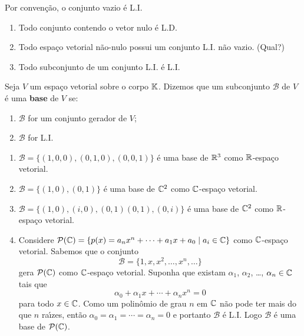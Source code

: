 \begin{observacao}\label{conjutoLDLI}
	Por conven\c{c}\~ao, o conjunto vazio \'e L.I.
\end{observacao}

\begin{propriedades}
	\begin{enumerate}[label={\roman*})]
		\item Todo conjunto contendo o vetor nulo \'e L.D.
		\item Todo espa\c{c}o vetorial n\~ao-nulo possui um conjunto L.I. n\~ao vazio. (Qual?)
		\item Todo subconjunto de um conjunto L.I. \'e L.I.
	\end{enumerate}
\end{propriedades}

\begin{definicao}
	Seja $V$ um espa\c{c}o vetorial sobre o corpo $\mathbb{K}$. Dizemos que um subconjunto $\mathcal{B}$ de $V$ \'e uma \textbf{base} de $V$ se:
	\begin{enumerate}[label={\roman*})]
		\item $\mathcal{B}$ for um conjunto gerador de $V$;
		\item $\mathcal{B}$ for L.I.
	\end{enumerate}
\end{definicao}

\begin{exemplo}
	\begin{enumerate}[label={\arabic*})]
		\item $\mathcal{B} = \{(1, 0 , 0), (0, 1, 0), (0, 0 ,1)\}$ \'e uma base de $\mathbb{R}^3$ como $\mathbb{R}$-espa\c{c}o vetorial.
		\item $\mathcal{B} = \{(1, 0), (0, 1)\}$ \'e uma base de $\mathbb{C}^2$ como $\mathbb{C}$-espa\c{c}o vetorial.
		\item $\mathcal{B} = \{(1, 0), (i , 0), (0, 1) (0, 1), (0, i)\}$ \'e uma base de $\mathbb{C}^2$ como $\mathbb{R}$-espa\c{c}o vetorial.
		\item Considere $\mathcal{P}(\mathbb{C}) = \{p(x) = a_nx^n + \cdots + a_1x + a_0 \mid a_i \in \mathbb{C}\}$ como $\mathbb{C}$-espa\c{c}o vetorial. Sabemos que o conjunto
		\[
			\mathcal{B} = \{1, x, x^2, \dots, x^n, \dots\}
		\]
		gera $\mathcal{P}(\mathbb{C})$ como $\mathbb{C}$-espa\c{c}o vetorial. Suponha que existam $\alpha_1$, $\alpha_2$, \dots, $\alpha_n \in \mathbb{C}$ tais que
		\[
			\alpha_0 + \alpha_1x + \cdots + \alpha_nx^n = 0
		\]
		para todo $x \in \mathbb{C}$. Como um polin\^omio de grau $n$ em $\mathbb{C}$ n\~ao pode ter mais do que $n$ ra{\'\i}zes, ent\~ao $\alpha_0 = \alpha_1 = \cdots = \alpha_n = 0$ e portanto $\mathcal{B}$ \'e L.I. Logo $\mathcal{B}$ \'e uma base de $\mathcal{P}(\mathbb{C})$.
	\end{enumerate}
\end{exemplo}

